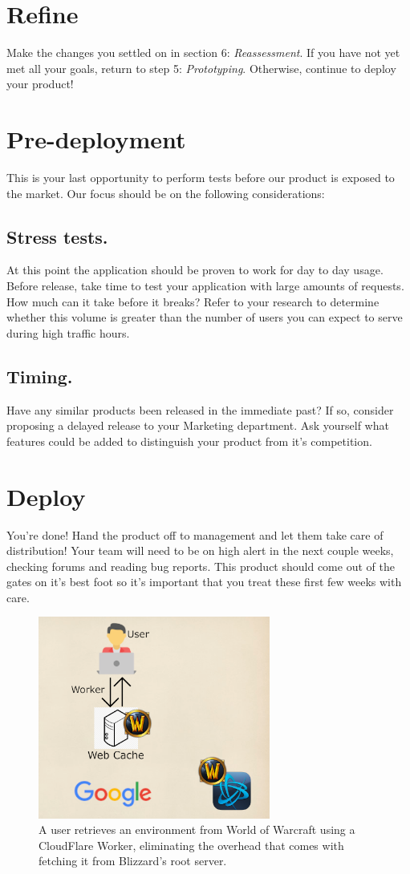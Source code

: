 \documentclass[12pt,journal,compsoc]{IEEEtran}
\begin{document}
\section{Refine} Make the changes you settled on in section 6: \textit{Reassessment}. If you have not yet met all your goals, return to step 5: \textit{Prototyping}. Otherwise, continue to deploy your product!

\section{Pre-deployment}This is your last opportunity to perform tests before our product is exposed to the market. Our focus should be on the following considerations:
    \subsection{Stress tests.}\hphantom{m}At this point the application should be proven to work for day to day usage. Before release, take time to test your application with large amounts of requests. How much can it take before it breaks? Refer to your research to determine whether this volume is greater than the number of users you can expect to serve during high traffic hours.
    \subsection{Timing. }\hphantom{m}Have any similar products been released in the immediate past? If so, consider proposing a delayed release to your Marketing department. Ask yourself what features could be added to distinguish your product from it's competition.
    
\section{Deploy}You're done! Hand the product off to management and let them take care of distribution! Your team will need to be on high alert in the next couple weeks, checking forums and reading bug reports. This product should come out of the gates on it's best foot so it's important that you treat these first few weeks with care.

\begin{figure}
    \centering
    \includegraphics[width=3in]{model.PNG}
    \caption{A user retrieves an environment from World of Warcraft using a CloudFlare Worker, eliminating the overhead that comes with fetching it from Blizzard's root server.}
    \label{fig:my_label}
\end{figure}

		
\end{document}
